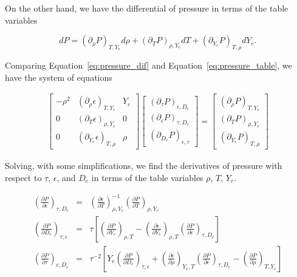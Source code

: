 On the other hand, we have the differential of pressure in terms of the table variables

\begin{equation}
 \label{eq:pressure_table}
  dP = (\partial_{\rho}P)_{T, Y_{e}}d\rho + (\partial_{T}P)_{\rho, Y_{e}}dT + (\partial_{Y_{e}}P)_{T, \rho}dY_{e}.
\end{equation}

Comparing Equation~\ref{eq:pressure_dif} and Equation~\ref{eq:pressure_table}, we have the system of equations

\begin{gather}
  \begin{bmatrix} 
 	-\rho^{2} & (\partial_{\rho}\epsilon)_{T,Y_{e}} & Y_{e} \\ 
 	0 & (\partial_{T}\epsilon)_{\rho,Y_{e}} & 0 \\
	 0 & (\partial_{Y_{e}}\epsilon)_{T,\rho} & \rho
  \end{bmatrix}
  \begin{bmatrix}
	(\partial_{\tau}P)_{\epsilon, D_{e}} \\ (\partial_{\epsilon}P)_{\tau, D_{e}} \\ (\partial_{D_{e}}P)_{\epsilon, \tau}
  \end{bmatrix}
 =
  \begin{bmatrix}
	(\partial_{\rho}P)_{T, Y_{e}} \\ (\partial_{T}P)_{\rho, Y_{e}} \\ (\partial_{Y_{e}}P)_{T, \rho}
  \end{bmatrix}
\end{gather}

Solving, with some simplifications, we find the derivatives of pressure with respect to $\tau$, $\epsilon$, and $D_{e}$
in terms of the table variables $\rho$, $T$, $Y_{e}$. \\

\begin{footnotesize}
\begin{eqnarray}
	\left(\frac{\partial{P}}{\partial{\epsilon}}\right)_{\tau,D_{e}} &=& \left(\frac{\partial{\epsilon}}{\partial{T}}\right)^{-1}_{\rho, Y_{e}}\left(\frac{\partial{P}}{\partial{T}}\right)_{\rho, Y_{e}} \\
	\left(\frac{\partial{P}}{\partial{D_{e}}}\right)_{\tau, \epsilon} &=& \tau \left[
					\left(\frac{\partial{P}}{\partial{Y_{e}}}\right)_{\rho, T} -
          \left(\frac{\partial{\epsilon}}{\partial{Y_{e}}}\right)_{\rho, T}
					\left(\frac{\partial{P}}{\partial{\epsilon}}\right)_{\tau, D_{e}}\right]\\
	\left(\frac{\partial{P}}{\partial{\tau}}\right)_{\epsilon, D_{e}} &=& \tau^{-2}
					\left[ Y_{e}\left(\frac{\partial{P}}{\partial{D_{e}}}\right)_{\tau, \epsilon}
					 + \left( \frac{\partial{\epsilon}}{\partial{\rho}} \right)_{Y_{e}, T}
          \left(\frac{\partial{P}}{\partial{\epsilon}}\right)_{\tau, D_{e}} - 
		  \left(\frac{\partial{P}}{\partial{\rho}}\right)_{T, Y_{e}} \right]
\end{eqnarray}
\end{footnotesize}
